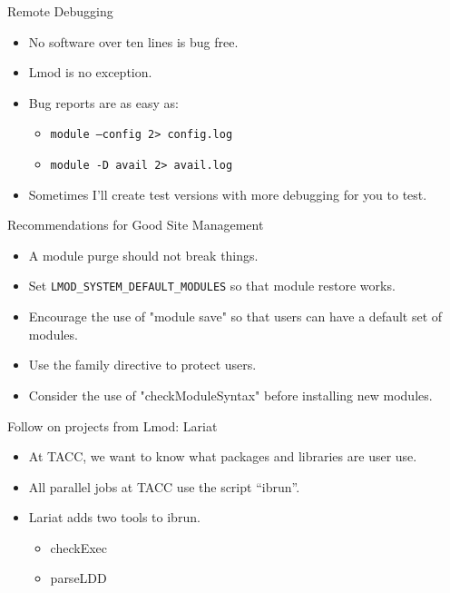 \documentclass{beamer}
\begin{document}
\begin{frame}{Remote Debugging}
  \begin{itemize}
    \item No software over ten lines is bug free.
    \item Lmod is no exception.
    \item Bug reports are as easy as:
      \begin{itemize}
        \item \texttt{module --config  2> config.log}
        \item \texttt{module -D avail  2> avail.log}
      \end{itemize}
    \item Sometimes I'll create test versions with more debugging for
      you to test.
  \end{itemize}
\end{frame}

\begin{frame}{Recommendations for Good Site Management}
  \begin{itemize}
    \item A module purge should not break things.
    \item Set \texttt{LMOD\_SYSTEM\_DEFAULT\_MODULES} so that module
      restore works.
    \item Encourage the use of "module save" so that users can have a
      default set of modules.
    \item Use the family directive to protect users.
    \item Consider the use of "checkModuleSyntax" before installing new modules.
  \end{itemize}
\end{frame}

\begin{frame}{Follow on projects from Lmod: Lariat}
  \begin{itemize}
    \item At TACC, we want to know what packages and libraries are
      user use.
    \item All parallel jobs at TACC use the script ``ibrun''.
    \item Lariat adds two tools to ibrun.
      \begin{itemize}
        \item checkExec
        \item parseLDD
      \end{itemize}
  \end{itemize}
\end{frame}
\end{document}
